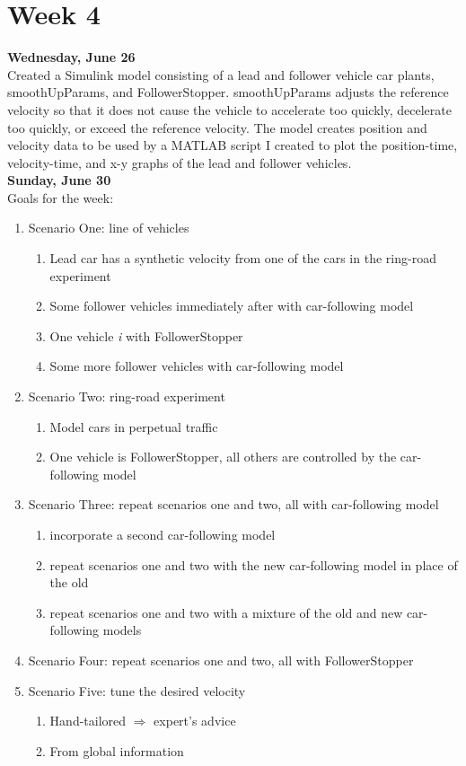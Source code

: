 \documentclass[12pt, letterpaper]{article}
\begin{document}
\noindent \section*{Week 4}

{\bf Wednesday, June 26} \\
Created a Simulink model consisting of a lead and follower vehicle car plants, smoothUpParams, and FollowerStopper. smoothUpParams adjusts the reference velocity so that it does not cause the vehicle to accelerate too quickly, decelerate too quickly, or exceed the reference velocity. The model creates position and velocity data to be used by a MATLAB script I created to plot the position-time, velocity-time, and x-y graphs of the lead and follower vehicles. \\

{\bf Sunday, June 30} \\
Goals for the week:
\begin{enumerate}
\item Scenario One: line of vehicles
	\begin{enumerate}
	\item Lead car has a synthetic velocity from one of the cars in the ring-road experiment
	\item Some follower vehicles immediately after with car-following model
	\item One vehicle {\it i} with FollowerStopper
	\item Some more follower vehicles with car-following model
	\end {enumerate}
\item Scenario Two: ring-road experiment
	\begin{enumerate}
	\item Model cars in perpetual traffic
	\item One vehicle is FollowerStopper, all others are controlled by the car-following model
	\end{enumerate}
\item Scenario Three: repeat scenarios one and two, all with car-following model
	\begin{enumerate}
	\item incorporate a second car-following model
	\item repeat scenarios one and two with the new car-following model in place of the old
	\item repeat scenarios one and two with a mixture of the old and new car-following models
	\end{enumerate}
\item Scenario Four: repeat scenarios one and two, all with FollowerStopper
\item Scenario Five: tune the desired velocity
	\begin{enumerate}
	\item Hand-tailored $\Rightarrow$ expert's advice
	\item From global information
	\end{enumerate}
\end{enumerate}
\end{document}
